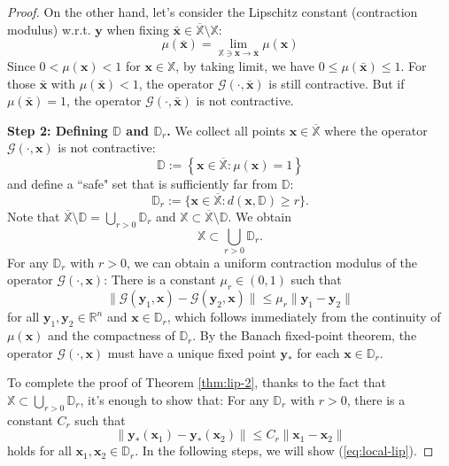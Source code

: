 \documentclass{amsart} %
\def\eqref#1{equation~\ref{#1}}
\def\vx{{\bm{x}}}
\def\vy{{\bm{y}}}
\def\sD{{\mathbb{D}}}
\def\sR{{\mathbb{R}}}
\def\sX{{\mathbb{X}}}
\def\cG{{\mathcal{G}}}
\theoremstyle{definition}
\theoremstyle{remark}
\renewcommand{\eqref}[1]{\textup{(\ref{#1})}}
\begin{document}
\begin{proof}
On the other hand, let's consider the Lipschitz constant (contraction modulus) w.r.t. $\vy$ when fixing $\bar \vx \in \overline{\sX}\setminus\sX$:
\[\mu(\bar\vx) = \lim_{\sX \ni \vx\to \bar\vx} \mu(\vx)\]
Since $0 < \mu(\vx) < 1$ for $\vx \in \sX$, by taking limit, we have $0 \leq \mu(\bar\vx) \leq 1$. For those $\bar\vx$ with $\mu(\bar\vx) < 1$, the operator $\cG(\cdot,\bar\vx)$ is still contractive. But if $\mu(\bar\vx) =1$, the operator $\cG(\cdot,\bar\vx)$ is not contractive. 


\textbf{Step 2: Defining $\sD$ and $\sD_r$.} We collect all points $\vx\in \overline{\sX}$ where the operator $\cG(\cdot,\vx)$ is not contractive:
\[ \sD:=\left\{ \vx \in \overline{\sX}: \mu(\vx)=1 \right\} \]
and define a ``safe" set that is sufficiently far from $\sD$:
\[\sD_r:= \big\{ \vx \in \overline{\sX}: d(\vx, \sD) \geq r \big\}.\]
Note that $\overline{\sX}\setminus\sD = \bigcup_{r > 0} \sD_r$ and $\sX \subset \overline{\sX}\setminus\sD$. We obtain
\[\sX \subset \bigcup_{r > 0} \sD_r.\]
For any $\sD_r$ with $r > 0$, we can obtain a uniform contraction modulus of the operator $\cG(\cdot,\vx)$: There is a constant $\mu_r \in (0,1)$ such that
\begin{equation}
\label{eq:local-contract}
\|\cG(\vy_1, \vx) - \cG(\vy_2,\vx)\| \leq \mu_r \|\vy_1 - \vy_2\|
\end{equation}
for all $\vy_1,\vy_2 \in \sR^n$ and $\vx \in \sD_r$, which follows immediately from the continuity of $\mu(\vx)$ and the compactness of $\sD_r$. By the Banach fixed-point theorem, the operator $\cG(\cdot,\vx)$ must have a unique fixed point $\vy_\ast$ for each $\vx\in\sD_r$. 

To complete the proof of Theorem \ref{thm:lip-2}, thanks to the fact that $\sX \subset \bigcup_{r > 0} \sD_r$, it's enough to show that: For any $\sD_r$ with $r > 0$, there is a constant $C_r$ such that
\begin{equation}
\label{eq:local-lip}
\| \vy_\ast(\vx_1) - \vy_\ast(\vx_2) \| \leq C_r \| \vx_1 - \vx_2 \|
\end{equation}
holds for all $\vx_1, \vx_2 \in \sD_r$. In the following steps, we will show \eqref{eq:local-lip}.


\end{proof}
\end{document}
